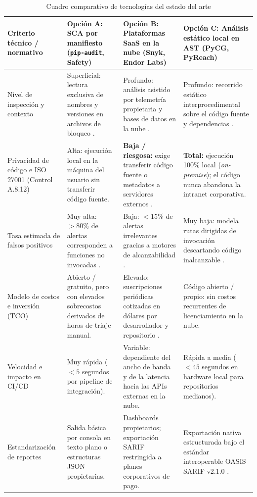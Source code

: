 \begin{table}[H]
\centering
\caption{Cuadro comparativo de tecnologías del estado del arte}
\label{tab:estado_arte}
\small
{}
\begin{tabularx}{\textwidth}{>{\raggedright\arraybackslash}p{3.2cm} X X X}
\toprule
\textbf{Criterio técnico / normativo} & 
\textbf{Opción A: SCA por manifiesto (\texttt{pip-audit}, Safety)} & 
\textbf{Opción B: Plataformas SaaS en la nube (Snyk, Endor Labs)} & 
\textbf{Opción C: Análisis estático local en AST (PyCG, PyReach)} \\
\midrule
Nivel de inspección y contexto & 
Superficial: lectura exclusiva de nombres y versiones en archivos de bloqueo \parencite{vargas2022analisis}. & 
Profundo: análisis asistido por telemetría propietaria y bases de datos en la nube \parencite{endorlabs2023state}. & 
Profundo: recorrido estático interprocedimental sobre el código fuente y dependencias \parencite{salis2021pycg}. \\ %
\addlinespace
Privacidad de código e ISO 27001 (Control A.8.12) & 
Alta: ejecución local en la máquina del usuario sin transferir código fuente. & 
\textbf{Baja / riesgosa:} exige transferir código fuente o metadatos a servidores externos \parencite{ladisa2023sok}. & 
\textbf{Total:} ejecución 100\% local (\textit{on-premise}); el código nunca abandona la intranet corporativa. \\ %
\addlinespace
Tasa estimada de falsos positivos & 
Muy alta: $>80\%$ de alertas corresponden a funciones no invocadas \parencite{pashchenko2022vuln4real}. & 
Baja: $<15\%$ de alertas irrelevantes gracias a motores de alcanzabilidad \parencite{endorlabs2023state}. & 
Muy baja: modela rutas dirigidas de invocación descartando código inalcanzable \parencite{salis2021pycg}. \\ %
\addlinespace
Modelo de costos e inversión (TCO) & 
Abierto / gratuito, pero con elevados sobrecostos derivados de horas de triaje manual. & 
Elevado: suscripciones periódicas cotizadas en dólares por desarrollador y repositorio \parencite{gutierrez2024auditoria}. & 
Código abierto / propio: sin costos recurrentes de licenciamiento en la nube. \\ %
\addlinespace
Velocidad e impacto en CI/CD & 
Muy rápida ($<5$ segundos por pipeline de integración). & 
Variable: dependiente del ancho de banda y de la latencia hacia las APIs externas en la nube. & 
Rápida a media ($<45$ segundos en hardware local para repositorios medianos). \\ %
\addlinespace
Estandarización de reportes & 
Salida básica por consola en texto plano o estructuras JSON propietarias. & 
Dashboards propietarios; exportación SARIF restringida a planes corporativos de pago. & 
Exportación nativa estructurada bajo el estándar interoperable OASIS SARIF v2.1.0 \parencite{oasis2019sarif}. \\ %
\bottomrule
\end{tabularx}
\end{table}


